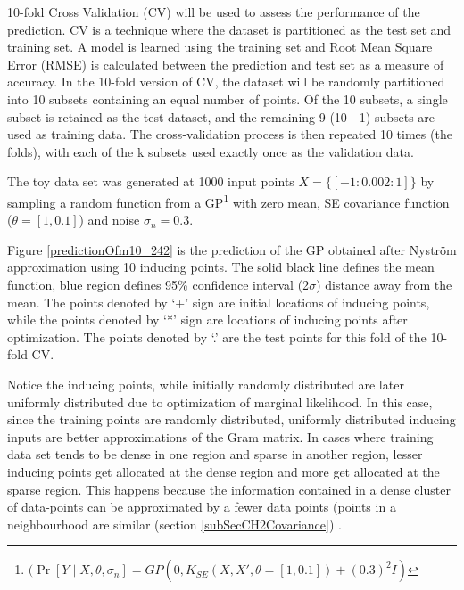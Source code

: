 10-fold Cross Validation (CV) will be used to assess the performance of the prediction. CV is a technique where the dataset is partitioned as the test set and training set. A model is learned using the training set and Root Mean Square Error (RMSE) is calculated between the prediction and test set as a measure of accuracy. In the 10-fold version of CV, the dataset will be randomly partitioned into 10 subsets containing an equal number of points. Of the 10 subsets, a single subset is retained as the test dataset, and the remaining 9 (10 - 1) subsets are used as training data. The cross-validation process is then repeated 10 times (the folds), with each of the k subsets used exactly once as the validation data.

The toy data set was generated at 1000 input points $X = \{[-1:0.002:1]\}$ by sampling a random function from a GP\footnote{$(\Pr[Y \mid X, \theta, \sigma_{n}] = GP(0, K_{SE}(X, X', \theta = [1, 0.1]) + (0.3)^{2}I)$} with zero mean, SE covariance function ($\theta = [1, 0.1]$) and noise $\sigma_{n} = 0.3$. 

Figure \ref{predictionOfm10_242} is the prediction of the GP obtained after Nystr\"{o}m approximation using 10 inducing points. The solid black line defines the mean function, blue region defines 95\% confidence interval (2$\sigma$) distance away from the mean. The points denoted by `+' sign are initial locations of inducing points, while the points denoted by `*' sign are locations of inducing points after optimization. The points denoted by `.' are the test points for this fold of the 10-fold CV. 

Notice the inducing points, while initially randomly distributed are later uniformly distributed due to optimization of marginal likelihood. In this case, since the training points are randomly distributed, uniformly distributed inducing inputs are better approximations of the Gram matrix. In cases where training data set tends to be dense in one region and sparse in another region, lesser inducing points get allocated at the dense region and more get allocated at the sparse region. This happens because the information contained in a dense cluster of data-points can be approximated by a fewer data points (points in a neighbourhood are similar (section \ref{subSecCH2Covariance}) \cite{Snelson06sparsegaussian}.

